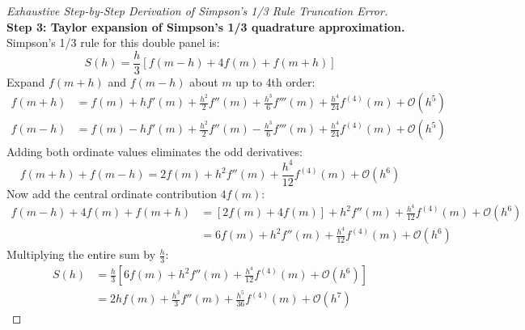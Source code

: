 \begin{proof}[Exhaustive Step-by-Step Derivation of Simpson's 1/3 Rule Truncation Error]
\noindent\textbf{Step 3: Taylor expansion of Simpson's 1/3 quadrature approximation.} \\
Simpson's 1/3 rule for this double panel is:
\begin{equation}
    S(h) = \frac{h}{3} \left[ f(m - h) + 4 f(m) + f(m + h) \right]
\end{equation}
Expand $f(m + h)$ and $f(m - h)$ about $m$ up to 4th order:
\begin{align}
    f(m + h) &= f(m) + h f'(m) + \frac{h^2}{2} f''(m) + \frac{h^3}{6} f'''(m) + \frac{h^4}{24} f^{(4)}(m) + \mathcal{O}(h^5) \\
    f(m - h) &= f(m) - h f'(m) + \frac{h^2}{2} f''(m) - \frac{h^3}{6} f'''(m) + \frac{h^4}{24} f^{(4)}(m) + \mathcal{O}(h^5)
\end{align}
Adding both ordinate values eliminates the odd derivatives:
\begin{equation}
    f(m + h) + f(m - h) = 2 f(m) + h^2 f''(m) + \frac{h^4}{12} f^{(4)}(m) + \mathcal{O}(h^6)
\end{equation}
Now add the central ordinate contribution $4 f(m)$:
\begin{align}
    f(m - h) + 4 f(m) + f(m + h) &= [2 f(m) + 4 f(m)] + h^2 f''(m) + \frac{h^4}{12} f^{(4)}(m) + \mathcal{O}(h^6) \nonumber \\
    &= 6 f(m) + h^2 f''(m) + \frac{h^4}{12} f^{(4)}(m) + \mathcal{O}(h^6)
\end{align}
Multiplying the entire sum by $\frac{h}{3}$:
\begin{align}
    \label{eq:simp_approx_expansion}
    S(h) &= \frac{h}{3} \left[ 6 f(m) + h^2 f''(m) + \frac{h^4}{12} f^{(4)}(m) + \mathcal{O}(h^6) \right] \nonumber \\
    &= 2h f(m) + \frac{h^3}{3} f''(m) + \frac{h^5}{36} f^{(4)}(m) + \mathcal{O}(h^7)
\end{align}


\end{proof}
